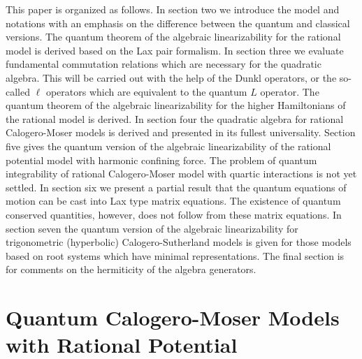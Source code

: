 \documentclass[a4paper,12pt]{article}
\begin{document}
This paper is organized as follows. In section two we introduce
the model and notations with an emphasis on the difference
between the quantum and classical versions. The quantum theorem
of the algebraic linearizability for the rational model is derived
based on the Lax pair formalism.
In section three we evaluate fundamental commutation relations
which are necessary for the quadratic algebra.
This will be carried out with the help of the Dunkl operators, or the
so-called $\ell$ operators which are equivalent to the quantum $L$
operator.
The quantum theorem of the algebraic linearizability for the
higher Hamiltonians of
the rational model is derived.
In section four the quadratic algebra for rational Calogero-Moser models
is derived and presented in its fullest universality.
Section five gives the quantum version of the algebraic linearizability
of the rational potential model with harmonic confining force.
The problem of quantum integrability of rational Calogero-Moser model
with quartic interactions is not yet settled.
In section six we present a partial result
that the quantum equations of motion can be cast into
 Lax type matrix equations. The existence of quantum conserved
quantities, however, does not follow from these matrix
equations. In section seven the quantum version of the
algebraic linearizability for trigonometric (hyperbolic)
Calogero-Sutherland models is given for those models based on
root systems which have minimal representations. The final
section is for comments on the hermiticity of the algebra
generators.



\section{Quantum Calogero-Moser Models with Rational Potential}
\label{cal-mo}
\setcounter{equation}{0}
\end{document}
